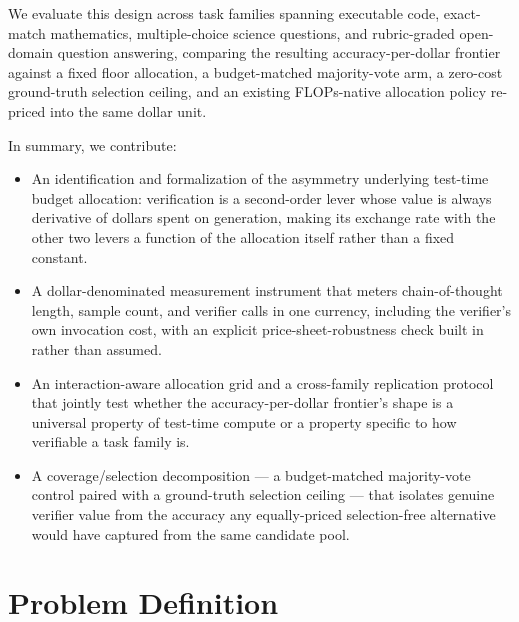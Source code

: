 \documentclass[11pt]{article}
\begin{document}
We evaluate this design across task families spanning executable code, exact-match mathematics, multiple-choice science questions, and rubric-graded open-domain question answering, comparing the resulting accuracy-per-dollar frontier against a fixed floor allocation, a budget-matched majority-vote arm, a zero-cost ground-truth selection ceiling, and an existing FLOPs-native allocation policy re-priced into the same dollar unit.

In summary, we contribute:
\begin{itemize}[leftmargin=1.4em]
\item An identification and formalization of the asymmetry underlying test-time budget allocation: verification is a second-order lever whose value is always derivative of dollars spent on generation, making its exchange rate with the other two levers a function of the allocation itself rather than a fixed constant.
\item A dollar-denominated measurement instrument that meters chain-of-thought length, sample count, and verifier calls in one currency, including the verifier's own invocation cost, with an explicit price-sheet-robustness check built in rather than assumed.
\item An interaction-aware allocation grid and a cross-family replication protocol that jointly test whether the accuracy-per-dollar frontier's shape is a universal property of test-time compute or a property specific to how verifiable a task family is.
\item A coverage/selection decomposition --- a budget-matched majority-vote control paired with a ground-truth selection ceiling --- that isolates genuine verifier value from the accuracy any equally-priced selection-free alternative would have captured from the same candidate pool.
\end{itemize}

\section{Problem Definition}
\end{document}
